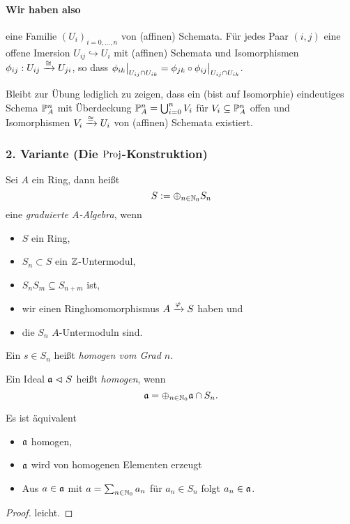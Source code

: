 \paragraph{Wir haben also}
eine Familie $(U_i)_{i=0,\ldots,n}$ von (affinen) Schemata. Für jedes Paar
$(i,j)$ eine offene Imersion $U_{ij} \hookrightarrow U_i$ mit
(affinen) Schemata
und Isomorphismen
$\phi_{ij}: U_{ij} \xto{\cong} U_{ji}$, so dass
$\phi_{ik} \rest{U_{ij} \cap U_{ik}} = 
	\phi_{jk} \circ \phi_{ij} \rest{U_{ij} \cap U_{ik}}$.

Bleibt zur Übung lediglich zu zeigen, dass ein (bist auf Isomorphie) 
eindeutiges Schema
$\P_A^n$ mit Überdeckung $\P_A^n = \bigcup_{i=0}^n V_i$ für 
$V_i \subseteq \P_A^n$ offen und Isomorphismen
$V_i \xto\cong U_i$ von (affinen) Schemata existiert.


\subsubsection{2. Variante (Die $\Proj$-Konstruktion)}

\begin{definition}
	Sei $A$ ein Ring, dann heißt
	\[ S:= \oplus_{n\in\N_0} S_n\]
	eine \emph{graduierte $A$-Algebra}, wenn
	\begin{itemize}
	  \item $S$ ein Ring,
	  \item $S_n \subset S$ ein $\Z$-Untermodul,
	  \item $S_n S_m \subseteq S_{n+m}$ ist,
	  \item wir einen Ringhomomorphismus $A \xto \varphi S$ haben und
	  \item die $S_n$ $A$-Untermoduln sind.
	\end{itemize}
	
	Ein $s \in S_n$ heißt \emph{homogen vom Grad $n$}.
\end{definition}

\begin{definition}
	\label{def:homogenes ideal}
	Ein Ideal $\a \ideal S$ heißt \emph{homogen}, wenn
	\[
		\a = \oplus_{n\in\N_0} \a \cap S_n.
	\]
\end{definition}

\begin{lemma}
	\label{lemma:ideal homogen <=> von homogenen elementen erzeugt}
	Es ist äquivalent
	\begin{itemize}
		\item $\a$ homogen,
		\item $\a$ wird von homogenen Elementen erzeugt
		\item Aus $a \in \a$ mit $a = \sum_{n\in \N_0} a_n$ für
			$a_n\in S_n$ folgt $a_n \in \a$.
	\end{itemize}
\end{lemma}
\begin{proof}
	leicht.
\end{proof}


